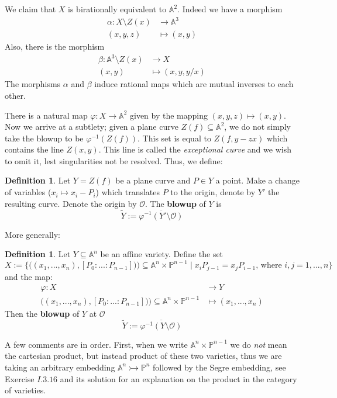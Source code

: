 \documentclass[12pt]{article}
\theoremstyle{plain}
\theoremstyle{definition}
\newtheorem{defn}[thm]{Definition} %
\newcommand{\bb}[1]{\mathbb{#1}}
\newcommand{\call}[1]{\mathcal{#1}}
\newcommand{\lto}{\longrightarrow}
\begin{document}
We claim that $X$ is birationally equivalent to $\bb{A}^2$. Indeed we have a morphism
\begin{align*}
    \alpha: X\setminus Z(x) &\lto \bb{A}^3\\
    (x,y,z) &\longmapsto (x,y)
\end{align*}
Also, there is the morphism
\begin{align*}
    \beta: \bb{A}^3\setminus Z(x) &\lto X\\
    (x,y) &\longmapsto (x,y,y/x)
\end{align*}
The morphisms $\alpha$ and $\beta$ induce rational maps which are mutual inverses to each other.

There is a natural map $\varphi: X \lto \bb{A}^2$ given by the mapping $(x,y,z) \longmapsto (x,y)$. Now we arrive at a subtlety; given a plane curve $Z(f) \subseteq \bb{A}^2$, we do not simply take the blowup to be $\varphi^{-1}(Z(f))$. This set is equal to $Z(f,y - zx)$ which contains the line $Z(x,y)$. This line is called the \emph{exceptional curve} and we wish to omit it, lest singularities not be resolved. Thus, we define:
\begin{defn}
\label{def:plane_curve_blowup}
Let $Y = Z(f)$ be a plane curve and $P \in Y$ a point. Make a change of variables ($x_i \mapsto x_i - P_i$) which translates $P$ to the origin, denote by $Y'$ the resulting curve. Denote the origin by $\call{O}$. The \textbf{blowup} of $Y$ is
\[\tilde{Y} := \overline{\varphi^{-1}(Y' \setminus \call{O})}\]
\end{defn}
More generally:
\begin{defn}
\label{def:general_blowup}
Let $Y \subseteq \bb{A}^n$ be an affine variety. Define the set
\[X := \lbrace \big((x_1,...,x_n),[P_0:...:P_{n-1}])\big) \subseteq \bb{A}^n \times \bb{P}^{n-1} \mid x_iP_{j-1} = x_jP_{i-1}\text{, where }i,j = 1,...,n\rbrace\]
and the map:
\begin{align*}
    \varphi: X &\lto Y\\
    \big((x_1,...,x_n),[P_0:...:P_{n-1}])\big) \subseteq \bb{A}^n \times \bb{P}^{n-1} &\longmapsto (x_1,...,x_n)
\end{align*}
Then the \textbf{blowup} of $Y$ at $\call{O}$
\[\tilde{Y} := \overline{\varphi^{-1}(Y\setminus \call{O})}\]
\end{defn}
A few comments are in order. First, when we write $\bb{A}^n \times \bb{P}^{n-1}$ we do \emph{not} mean the cartesian product, but instead product of these two varieties, thus we are taking an arbitrary embedding $\bb{A}^n \rightarrowtail \bb{P}^n$ followed by the Segre embedding, see Exercise $I.3.16$ and its solution \cite{hartshorne_solutions} for an explanation on the product in the category of varieties.
\end{document}
